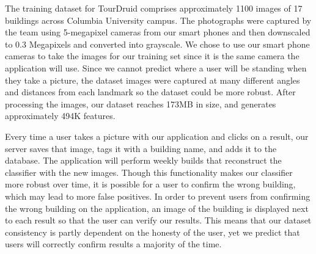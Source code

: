 The training dataset for TourDruid comprises approximately 1100 images of 17 buildings across Columbia University campus. The photographs were captured by the team using 5-megapixel cameras from our smart phones and then downscaled to 0.3 Megapixels and converted into grayscale. We chose to use our smart phone cameras to take the images for our training set since it is the same camera the application will use. Since we cannot predict where a user will be standing when they take a picture, the dataset images were captured at many different angles and distances from each landmark so the dataset could be more robust. After processing the images, our dataset reaches 173MB in size, and generates approximately 494K features.

Every time a user takes a picture with our application and clicks on a result, our server saves that image, tags it with a building name, and adds it to the database. The application will perform weekly builds that reconstruct the classifier with the new images. Though this functionality makes our classifier more robust over time, it is possible for a user to confirm the wrong building, which may lead to more false positives. In order to prevent users from confirming the wrong building on the application, an image of the building is displayed next to each result so that the user can verify our results. This means that our dataset consistency is partly dependent on the honesty of the user, yet we predict that users will correctly confirm results a majority of the time.